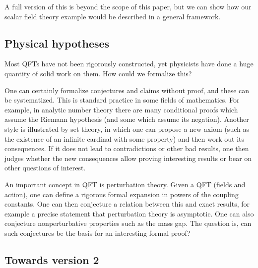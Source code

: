 \documentclass{article}
\newcommand{\1}{\mathbbm{1}}
\theoremstyle{plain}
\theoremstyle{definition}
\numberwithin{equation}{section}
\begin{document}
A full version of this is beyond the scope of this paper, but we can show how our scalar field theory example would be described in a general framework.

\subsection{Physical hypotheses}

Most QFTs have not been rigorously constructed, yet physicists have done a huge quantity of solid work on them.  How could we formalize this?

One can certainly formalize conjectures and claims without proof, and these can be systematized.  
This is standard practice in some fields of mathematics.  For example, in analytic number theory there are many conditional proofs which
assume the Riemann hypothesis (and some which assume its negation).  Another style is illustrated by set theory, 
in which one can propose a new axiom (such as the existence of an infinite cardinal with some property) and then work out its
consequences.  If it does not lead to contradictions or other bad results, one then judges whether the new consequences allow
proving interesting results or bear on other questions of interest. 

An important concept in QFT is perturbation theory.  Given a QFT (fields and action), one can define a rigorous formal expansion
in powers of the coupling constants.  One can then conjecture a relation between this and exact results, for example a precise statement
that perturbation theory is asymptotic.  One can also conjecture nonperturbative properties such as the mass gap.  The question is, can such
conjectures be the basis for an interesting formal proof?

\subsection{Towards version 2}
\end{document}
